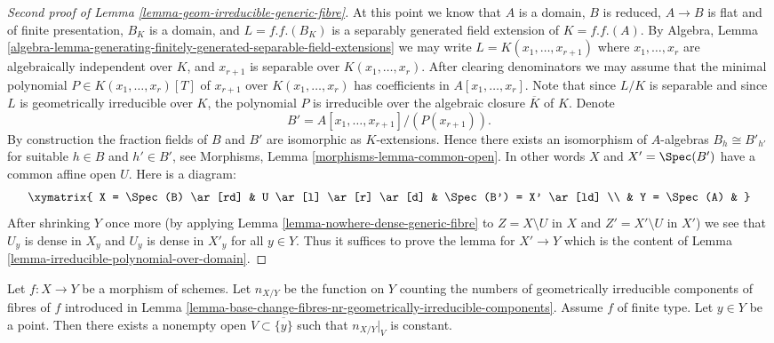 \begin{proof}[Second proof of Lemma \ref{lemma-geom-irreducible-generic-fibre}]
\medskip\noindent
At this point we know that $A$ is a domain, $B$ is reduced, $A \to B$
is flat and of finite presentation, $B_K$ is a domain, and
$L = f.f.(B_K)$ is a separably generated field extension of $K = f.f.(A)$. By
Algebra, Lemma
\ref{algebra-lemma-generating-finitely-generated-separable-field-extensions}
we may write $L = K(x_1, \ldots, x_{r + 1})$
where $x_1, \ldots, x_r$ are algebraically independent over $K$, and
$x_{r + 1}$ is separable over $K(x_1, \ldots, x_r)$. After clearing
denominators we may assume that the minimal polynomial
$P \in K(x_1, \ldots, x_r)[T]$ of $x_{r + 1}$ over $K(x_1, \ldots, x_r)$
has coefficients in $A[x_1, \ldots, x_r]$. Note that since
$L/K$ is separable and since $L$ is geometrically irreducible over
$K$, the polynomial $P$ is irreducible over the algebraic closure
$\overline{K}$ of $K$. Denote
$$
B' = A[x_1, \ldots, x_{r + 1}]/(P(x_{r + 1})).
$$
By construction the fraction fields of $B$ and $B'$ are isomorphic as
$K$-extensions. Hence there exists an isomorphism of $A$-algebras
$B_h \cong B'_{h'}$ for suitable $h \in B$ and $h' \in B'$, see
Morphisms, Lemma \ref{morphisms-lemma-common-open}.
In other words $X$ and $X' = \Spec(B')$ have a common affine open $U$.
Here is a diagram:
$$
\xymatrix{
X = \Spec(B) \ar[rd] &
U \ar[l] \ar[r] \ar[d] &
\Spec(B') = X' \ar[ld] \\
& Y = \Spec(A) &
}
$$
After shrinking $Y$ once more (by applying
Lemma \ref{lemma-nowhere-dense-generic-fibre}
to $Z = X \setminus U$ in $X$ and $Z' = X' \setminus U$ in $X'$)
we see that $U_y$ is dense in $X_y$ and $U_y$ is dense in $X'_y$
for all $y \in Y$. Thus it suffices to prove the lemma for
$X' \to Y$ which is the content of
Lemma \ref{lemma-irreducible-polynomial-over-domain}.
\end{proof}

\begin{lemma}
\label{lemma-nr-geom-irreducible-components-good}
Let $f : X \to Y$ be a morphism of schemes. Let
$n_{X/Y}$ be the function on $Y$ counting the numbers of geometrically
irreducible components of fibres of $f$ introduced in
Lemma \ref{lemma-base-change-fibres-nr-geometrically-irreducible-components}.
Assume $f$ of finite type.
Let $y \in Y$ be a point. Then there exists a nonempty open
$V \subset \overline{\{y\}}$ such that $n_{X/Y}|_V$ is constant.
\end{lemma}

